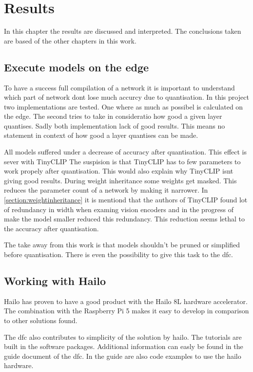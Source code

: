 \chapter{Results}
In this chapter the results are discussed and interpreted.
The conclusions taken are based of the other chapters in this work.

\section{Execute models on the edge}
To have a success full compilation of a network it is important to understand which part of network dont lose much accurcy due to quantisation.
In this project two implementations are tested.
One where as much as possibel is calculated on the edge.
The second tries to take in consideratio how good a given layer quantises.
Sadly both implementation lack of good results.
This means no statement in context of how good a layer quantises can be made.

All models suffered under a decrease of accuracy after quantisation.
This effect is sever with TinyCLIP
The suspision is that TinyCLIP has to few parameters to work propely after quantisation.
This would also explain why TinyCLIP isnt giving good results.
During weight inheritance some weights get masked.
This reduces the parameter count of a network by making it narrower.
In \cref{section:weightinheritance} it is mentiond that the authors of TinyCLIP found lot of redundancy in width when examing vision encoders and in the progress of make the model smaller reduced this redundancy.
This reduction seems lethal to the accuracy after quantisation.

The take away from this work is that models shouldn't be pruned or simplified before quantisation.
There is even the possibility to give this task to the \acrshort{dfc}.

\section{Working with Hailo}

Hailo has proven to have a good product with the Hailo 8L hardware accelerator.
The combination with the Raspberry Pi 5 makes it easy to develop in comparison to other solutions found.

The \acrshort{dfc} also contributes to simplicity of the solution by hailo.
The tutorials are built in the software packages.
Additional information can easly be found in the guide document of the \acrshort{dfc}.
In the guide are also code examples to use the hailo hardware.

